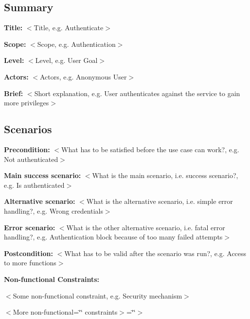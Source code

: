 \subsection*{Summary}


\begin{DoxyItemize}
\item {\bfseries Title\+:} $<$Title, e.\+g. Authenticate$>$
\item {\bfseries Scope\+:} $<$Scope, e.\+g. Authentication$>$
\item {\bfseries Level\+:} $<$Level, e.\+g. User Goal$>$
\item {\bfseries Actors\+:} $<$Actors, e.\+g. Anonymous User$>$
\item {\bfseries Brief\+:} $<$Short explanation, e.\+g. User authenticates against the service to gain more privileges$>$
\end{DoxyItemize}

\subsection*{Scenarios}


\begin{DoxyItemize}
\item {\bfseries Precondition\+:} $<$What has to be satisfied before the use case can work?, e.\+g. Not authenticated$>$
\item {\bfseries Main success scenario\+:} $<$What is the main scenario, i.\+e. success scenario?, e.\+g. Is authenticated$>$
\item {\bfseries Alternative scenario\+:} $<$What is the alternative scenario, i.\+e. simple error handling?, e.\+g. Wrong credentials$>$
\item {\bfseries Error scenario\+:} $<$What is the other alternative scenario, i.\+e. fatal error handling?, e.\+g. Authentication block because of too many failed attempts$>$
\item {\bfseries Postcondition\+:} $<$What has to be valid after the scenario was run?, e.\+g. Access to more functions$>$
\item {\bfseries Non-\/functional Constraints\+:}
\begin{DoxyItemize}
\item $<$Some non-\/functional constraint, e.\+g. Security mechanism$>$
\item $<$\+More non-\/functional=\char`\"{}\char`\"{} constraints$>$=\char`\"{}\char`\"{}$>$ 
\end{DoxyItemize}
\end{DoxyItemize}